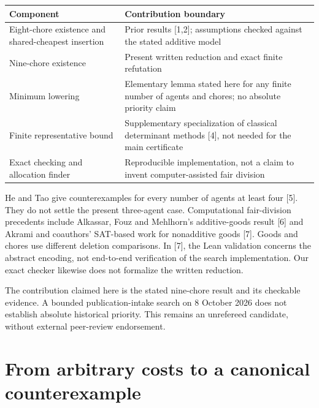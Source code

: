\documentclass[
  11pt,
]{article}
\newcounter{none} %
\begin{document}
{\def\LTcaptype{none} %
\begin{longtable}[]{@{}
  >{\raggedright\arraybackslash}p{}
  >{\raggedright\arraybackslash}p{}@{}}
\toprule\noalign{}
\begin{minipage}[b]{\linewidth}\raggedright
Component
\end{minipage} & \begin{minipage}[b]{\linewidth}\raggedright
Contribution boundary
\end{minipage} \\
\midrule\noalign{}
\endhead
\bottomrule\noalign{}
\endlastfoot
Eight-chore existence and shared-cheapest insertion & Prior results
{[}1,2{]}; assumptions checked against the stated additive model \\
Nine-chore existence & Present written reduction and exact finite
refutation \\
Minimum lowering & Elementary lemma stated here for any finite number of
agents and chores; no absolute priority claim \\
Finite representative bound & Supplementary specialization of classical
determinant methods {[}4{]}, not needed for the main certificate \\
Exact checking and allocation finder & Reproducible implementation, not
a claim to invent computer-assisted fair division \\
\end{longtable}
}

He and Tao give counterexamples for every number of agents at least four
{[}5{]}. They do not settle the present three-agent case. Computational
fair-division precedents include Alkassar, Fouz and Mehlhorn's
additive-goods result {[}6{]} and Akrami and coauthors' SAT-based work
for nonadditive goods {[}7{]}. Goods and chores use different deletion
comparisons. In {[}7{]}, the Lean validation concerns the abstract
encoding, not end-to-end verification of the search implementation. Our
exact checker likewise does not formalize the written reduction.

The contribution claimed here is the stated nine-chore result and its
checkable evidence. A bounded publication-intake search on 8 October
2026 does not establish absolute historical priority. This remains an
unrefereed candidate, without external peer-review endorsement.

\section{From arbitrary costs to a canonical
counterexample}\label{from-arbitrary-costs-to-a-canonical-counterexample}
\end{document}

